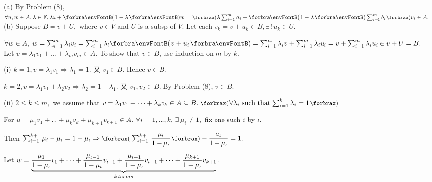\par\quad
(a) By Problem (8), $\forall u, w\in A,\lambda\in\Fbb,\lambda u+\Par{1-\lambda}w=\XPar{\lambda\sum_{i=1}^m a_i+\Par{1-\lambda}\sum_{i=1}^m b_i}v_i\in A.$\PfEnd\vspace{8pt}\quad
(b) Suppose $B=v+U,$ where $v\in V$ and $U$ is a subsp of $V.$ Let each $v_k=v+u_k\in B,\exists\,!\,u_k\in U.$\par\quad\Hb
$\forall w\in A,\;w=\sum_{i=1}^m \lambda_i v_i=\sum_{i=1}^m \lambda_i\Par{v+u_i}=\sum_{i=1}^m \lambda_i v+\sum_{i=1}^m \lambda_i u_i=v+\sum_{i=1}^m \lambda_i u_i\in v+U=B.$\PfEnd\vspace{8pt}\quad\Hb 
\Or \vspace{2pt}Let $v=\lambda_1 v_1+\dots+\lambda_m v_m\in A$. To show that $v\in B$, use induction on $m$ by $k$.\par\quad\Hb
(i) \vspace{2pt}$k=1,v=\lambda_1 v_1\Rightarrow \lambda_1=1.$ 又 $v_1\in B.$ Hence $v\in B$.\par\quad\Hb\Hi
\vspace{6pt}$k=2,v=\lambda_1 v_1+\lambda_2 v_2\Rightarrow\lambda_2=1-\lambda_1.$ 又 $v_1,v_2\in B.$ By Problem (8), $v\in B$.\par\quad\Hb\Endi
(ii) \vspace{6pt}$2\leqslant k\leqslant m,$ we assume that $v=\lambda_1 v_1+\dots+\lambda_k v_k\in A\subseteq B.\;\XPar{\forall\lambda_i$ such that $\sum_{i=1}^k\lambda_i=1}$\par\quad\Hb\Hii
\vspace{6pt}For $u=\mu_1 v_1+\dots+\mu_k v_k+\mu_{k+1} v_{k+1}\in A.\,\,\forall i=1,\dots,k,\,\exists\,\mu_i\neq 1,$ fix one such $i$ by $\iota$.\par\quad\Hb\Hii
\vspace{6pt}Then $\sum_{i=1}^{k+1}\mu_i-\mu_\iota=1-\mu_\iota\Rightarrow\XPar{\sum_{i=1}^{k+1}\Frac{\mu_i}{1-\mu_\iota}}-\Frac{\mu_\iota}{1-\mu_\iota}=1.$\par\quad\Hb\Hii
\vspace{6pt}Let $w=\underbrace{{\displaystyle{\frac{\mu_1}{1-\mu_\iota}}}v_1+\dots+{\displaystyle{\frac{\mu_{\iota-1}}{1-\mu_\iota}}}v_{\iota-1}+{\displaystyle{\frac{\mu_{\iota+1}}{1-\mu_\iota}}}v_{\iota+1}+\dots+{\displaystyle{\frac{\mu_{k+1}}{1-\mu_\iota}}}v_{k+1}}_{k\,terms}.$\par\quad\Hb\Hii
